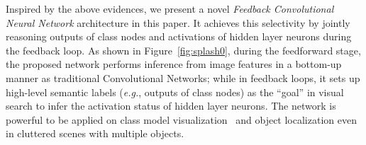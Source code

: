 Inspired by the above evidences, we present a novel \emph{Feedback Convolutional Neural Network} architecture in this paper. It achieves this selectivity by jointly reasoning outputs of class nodes and activations of hidden layer neurons during the feedback loop. As shown in Figure~\ref{fig:splash0}, during the feedforward stage, the proposed network performs inference from image features in a bottom-up manner as traditional Convolutional Networks; while in feedback loops, it sets up high-level semantic labels (\emph{e.g.}, outputs of class nodes) as the ``goal'' in visual search to infer the activation status of hidden layer neurons. The network is powerful to be applied on class model visualization~\cite{simonyan2013deep, zeiler2014visualizing} and object localization even in cluttered scenes with multiple objects.

